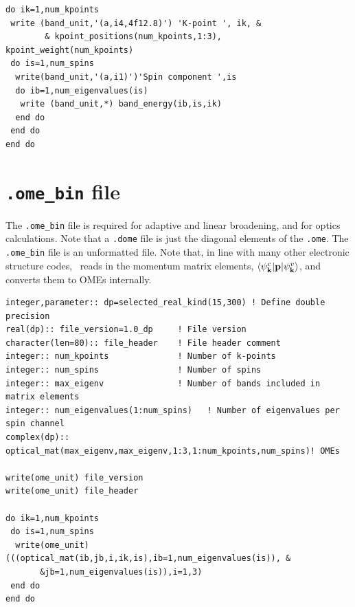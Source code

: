 \documentclass[a4paper,11pt,twoside]{book}
\begin{document}
{\begin{appendix}
\begin{verbatim}
do ik=1,num_kpoints
 write (band_unit,'(a,i4,4f12.8)') 'K-point ', ik, &
        & kpoint_positions(num_kpoints,1:3), kpoint_weight(num_kpoints)
 do is=1,num_spins
  write(band_unit,'(a,i1)')'Spin component ',is
  do ib=1,num_eigenvalues(is)
   write (band_unit,*) band_energy(ib,is,ik) 
  end do
 end do
end do
\end{verbatim}
\section{\texttt{.ome\_bin} file}
The \texttt{.ome\_bin} file is required for adaptive and linear broadening, and for optics calculations. 
%
Note that a \texttt{.dome} file is just the diagonal elements of the \texttt{.ome}.
%
The \texttt{.ome\_bin} file is an unformatted file.
%
Note that, in line with many other electronic structure codes, \optados\ reads in the momentum matrix elements, $\langle \psi^c_{\bf k}  |  {\bf p} | \psi^v_{\bf k} \rangle$, and converts them to OMEs internally.
\begin{verbatim}
integer,parameter:: dp=selected_real_kind(15,300) ! Define double precision
real(dp):: file_version=1.0_dp     ! File version
character(len=80):: file_header    ! File header comment
integer:: num_kpoints              ! Number of k-points
integer:: num_spins                ! Number of spins
integer:: max_eigenv               ! Number of bands included in matrix elements
integer:: num_eigenvalues(1:num_spins)   ! Number of eigenvalues per spin channel
complex(dp):: optical_mat(max_eigenv,max_eigenv,1:3,1:num_kpoints,num_spins)! OMEs

write(ome_unit) file_version
write(ome_unit) file_header

do ik=1,num_kpoints
 do is=1,num_spins
  write(ome_unit) (((optical_mat(ib,jb,i,ik,is),ib=1,num_eigenvalues(is)), &
       &jb=1,num_eigenvalues(is)),i=1,3)
 end do
end do
\end{verbatim}

\end{appendix}}
\end{document}
